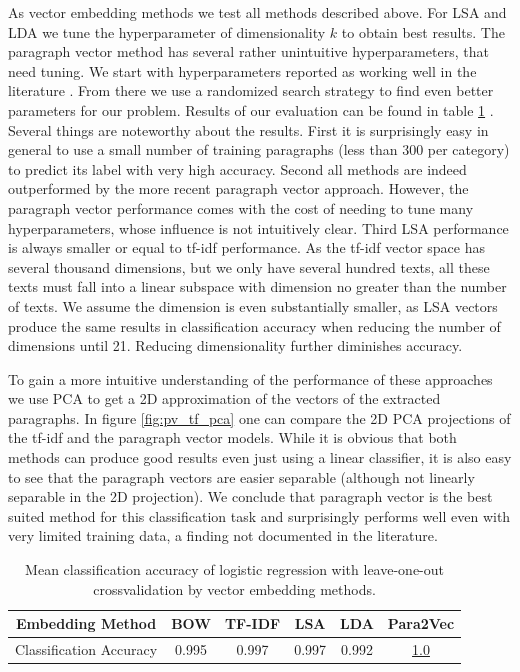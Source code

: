 As vector embedding methods we test all methods described above. For LSA and LDA we tune the hyperparameter of dimensionality $k$ to obtain best results. The paragraph vector method has several rather unintuitive hyperparameters, that need tuning. We start with hyperparameters reported as working well in the literature \citep{Lau2016}. From there we use a randomized search strategy to find even better parameters for our problem. Results of our evaluation can be found in table \ref{table:para_class_acc}   . Several things are noteworthy about the results. First it is surprisingly easy in general to use a small number of training paragraphs (less than 300 per category) to predict its label with very high accuracy. Second all methods are indeed outperformed by the more recent paragraph vector approach. However, the paragraph vector performance comes with the cost of needing to tune many hyperparameters, whose influence is not intuitively clear. Third LSA performance is always smaller or equal to tf-idf performance. As the tf-idf vector space has several thousand dimensions, but we only have several hundred texts, all these texts must fall into a linear subspace with dimension no greater than the number of texts. We assume the dimension is even substantially smaller, as LSA vectors produce the same results in classification accuracy when reducing the number of dimensions until 21. Reducing dimensionality further diminishes accuracy. 

To gain a more intuitive understanding of the performance of these approaches we use PCA to get a 2D approximation of the vectors of the extracted paragraphs. In figure \ref{fig:pv_tf_pca} one can compare the 2D PCA projections of the tf-idf and the paragraph vector models. While it is obvious that both methods can produce good results even just using a linear classifier, it is also easy to see that the paragraph vectors are easier separable (although not linearly separable in the 2D projection). We conclude that paragraph vector is the best suited method for this classification task and surprisingly performs well even with very limited training data, a finding not documented in the literature.
\begin{table}
	\begin{tabular}{|c||c|c|c|c|c|}
		\hline 
		Embedding Method & BOW & TF-IDF & LSA & LDA  & Para2Vec\tabularnewline
		\hline 
		\hline 
		Classification Accuracy & 0.995 & 0.997 & 0.997 & 0.992 & \underline{1.0}\tabularnewline
		\hline 
	\end{tabular}
	\caption{Mean classification accuracy of logistic regression with leave-one-out crossvalidation by vector embedding methods.}
	\label{table:para_class_acc}
\end{table}

